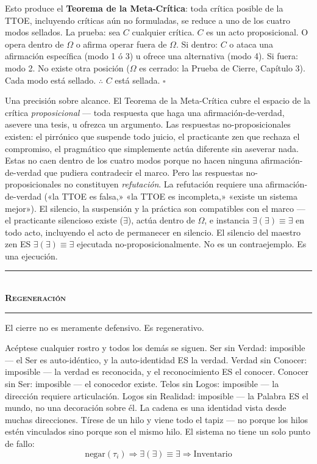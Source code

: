 \documentclass[10pt, openany, oneside]{book}
\renewcommand{\normalsize}{\fontsize{10}{13}\selectfont}
\begin{document}
Esto produce el \textbf{Teorema de la Meta-Crítica}: toda crítica posible de la TTOE, incluyendo críticas aún no formuladas, se reduce a uno de los cuatro modos sellados. La prueba: sea $C$ cualquier crítica. $C$ es un acto proposicional. O opera dentro de $\Omega$ o afirma operar fuera de $\Omega$. Si dentro: $C$ o ataca una afirmación específica (modo 1 ó 3) u ofrece una alternativa (modo 4). Si fuera: modo 2. No existe otra posición ($\Omega$ es cerrado: la Prueba de Cierre, Capítulo 3). Cada modo está sellado. $\therefore$ $C$ está sellada. $\square$

Una precisión sobre alcance. El Teorema de la Meta-Crítica cubre el espacio de la crítica \textit{proposicional} --- toda respuesta que haga una afirmación-de-verdad, asevere una tesis, u ofrezca un argumento. Las respuestas no-proposicionales existen: el pirrónico que suspende todo juicio, el practicante zen que rechaza el compromiso, el pragmático que simplemente actúa diferente sin aseverar nada. Estas no caen dentro de los cuatro modos porque no hacen ninguna afirmación-de-verdad que pudiera contradecir el marco. Pero las respuestas no-proposicionales no constituyen \textit{refutación}. La refutación requiere una afirmación-de-verdad («la TTOE es falsa,» «la TTOE es incompleta,» «existe un sistema mejor»). El silencio, la suspensión y la práctica son compatibles con el marco --- el practicante silencioso existe ($\exists$), actúa dentro de $\Omega$, e instancia $\exists(\exists) \equiv \exists$ en todo acto, incluyendo el acto de permanecer en silencio. El silencio del maestro zen ES $\exists(\exists) \equiv \exists$ ejecutada no-proposicionalmente. No es un contraejemplo. Es una ejecución.

\vspace{1.5em}


\begin{center}
    \rule{0.3\textwidth}{0.4pt}\\[0.5em]
    {\normalsize\bfseries\scshape Regeneración}\\[0.3em]
    \rule{0.3\textwidth}{0.4pt}
\end{center}

\vspace{1em}

\noindent El cierre no es meramente defensivo. Es regenerativo.

Acéptese cualquier rostro y todos los demás se siguen. Ser sin Verdad: imposible --- el Ser es auto-idéntico, y la auto-identidad ES la verdad. Verdad sin Conocer: imposible --- la verdad es reconocida, y el reconocimiento ES el conocer. Conocer sin Ser: imposible --- el conocedor existe. Telos sin Logos: imposible --- la dirección requiere articulación. Logos sin Realidad: imposible --- la Palabra ES el mundo, no una decoración sobre él. La cadena es una identidad vista desde muchas direcciones. Tírese de un hilo y viene todo el tapiz --- no porque los hilos estén vinculados sino porque son el mismo hilo. El sistema no tiene un solo punto de fallo:
$$\text{negar}(\tau_i) \Rightarrow \exists(\exists) \equiv \exists \Rightarrow \text{Inventario}$$
\end{document}

